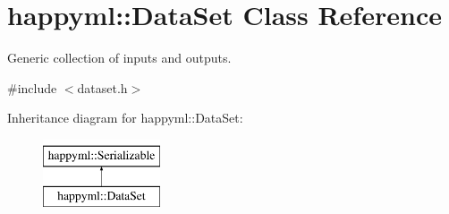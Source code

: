 \hypertarget{classhappyml_1_1DataSet}{}\section{happyml\+:\+:Data\+Set Class Reference}
\label{classhappyml_1_1DataSet}


Generic collection of inputs and outputs.  




{\ttfamily \#include $<$dataset.\+h$>$}

Inheritance diagram for happyml\+:\+:Data\+Set\+:\begin{figure}[H]
\begin{center}
\leavevmode
\includegraphics[height=2.000000cm]{classhappyml_1_1DataSet}
\end{center}
\end{figure}
